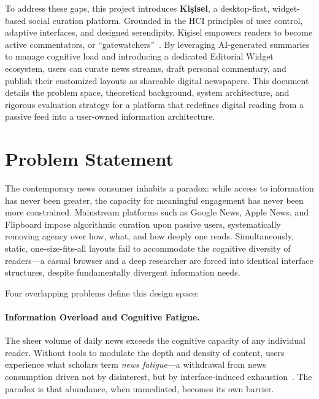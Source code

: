 \documentclass[14pt]{article}
\begin{document}
To address these gaps, this project introduces \textbf{Ki\c{s}isel}, a desktop-first, widget-based social curation platform. Grounded in the HCI principles of user control, adaptive interfaces, and designed serendipity, Ki\c{s}isel empowers readers to become active commentators, or ``gatewatchers''~\cite{bruns2005}. By leveraging AI-generated summaries to manage cognitive load and introducing a dedicated Editorial Widget ecosystem, users can curate news streams, draft personal commentary, and publish their customized layouts as shareable digital newspapers. This document details the problem space, theoretical background, system architecture, and rigorous evaluation strategy for a platform that redefines digital reading from a passive feed into a user-owned information architecture.

\section{Problem Statement}

The contemporary news consumer inhabits a paradox: while access to information has never been greater, the capacity for meaningful engagement has never been more constrained. Mainstream platforms such as Google News, Apple News, and Flipboard impose algorithmic curation upon passive users, systematically removing agency over how, what, and how deeply one reads. Simultaneously, static, one-size-fits-all layouts fail to accommodate the cognitive diversity of readers---a casual browser and a deep researcher are forced into identical interface structures, despite fundamentally divergent information needs.

Four overlapping problems define this design space:

\paragraph{Information Overload and Cognitive Fatigue.}
The sheer volume of daily news exceeds the cognitive capacity of any individual reader. Without tools to modulate the depth and density of content, users experience what scholars term \emph{news fatigue}---a withdrawal from news consumption driven not by disinterest, but by interface-induced exhaustion~\cite{newman2022}. The paradox is that abundance, when unmediated, becomes its own barrier.
\end{document}
